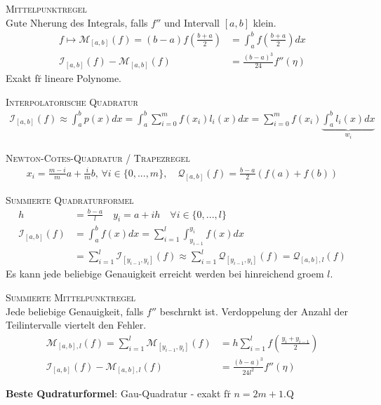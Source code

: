 \textsc{Mittelpunktregel}\\
Gute N\a herung des Integrals, falls $f''$ und Intervall $[a,b]$ klein.
\begin{align*}
f \mapsto \mathcal{M}_{[a,b]}(f) = (b-a)f\left(\frac{b+a}{2}\right) &= \int_a^b f\left(\frac{b+a}{2}\right) dx\\
\mathcal{I}_{[a,b]}(f)-\mathcal{M}_{[a,b]}(f) &= \frac{(b-a)^3}{24}f''(\eta)
\end{align*}
Exakt f\u r lineare Polynome.

\textsc{Interpolatorische Quadratur}\\
\begin{align*}
\mathcal{I}_{[a,b]}(f) \approx \int_a^b p(x) dx = \int_a^b \sum_{i=0}^m f(x_i)l_i(x)dx=\sum_{i=0}^m f(x_i) \underbrace{\int_a^b l_i(x)dx}_{w_i}
\end{align*}\vspace{0.2cm}

\textsc{Newton-Cotes-Quadratur / Trapezregel}\\
\begin{align*}
x_i = \frac{m-i}{m}a + \frac{i}{m}b, \, \forall i\in \{0,...,m\}, \quad \mathcal{Q}_{[a,b]}(f)=\frac{b-a}{2}(f(a)+f(b))
\end{align*}

\textsc{Summierte Quadraturformel}\\
\begin{align*}
h&=\frac{b-a}{l} \quad y_i = a+ih \quad \forall i\in \{0,...,l\}\\
\mathcal{I}_{[a,b]}(f)&=\int_a^b f(x)dx = \sum_{i=1}^l\int_{y_{i-1}}^{y_i} f(x)dx\\ &= \sum_{i=1}^l \mathcal{I}_{[y_{i-1},y_i]}(f) \approx \sum_{i=1}^l \mathcal{Q}_{[y_{i-1},y_i]}(f) = \mathcal{Q}_{[a,b],l}(f)
\end{align*}
Es kann jede beliebige Genauigkeit erreicht werden bei hinreichend gro\s em $l$.

\textsc{Summierte Mittelpunktregel}\\
Jede beliebige Genauigkeit, falls $f''$ beschr\a nkt ist. Verdoppelung der Anzahl der Teilintervalle viertelt den Fehler.
\begin{align*}
\mathcal{M}_{[a,b],l}(f) = \sum_{i=1}^l \mathcal{M}_{[y_{i-1},y_i]}(f) &= h \sum_{i=1}^l f \left(\frac{y_i+y_{i-1}}{2}\right)\\
\mathcal{I}_{[a,b]}(f)-\mathcal{M}_{[a,b],l}(f) &= \frac{(b-a)^3}{24l^2}f''(\eta)
\end{align*}

\textbf{Beste Qudraturformel}: Gau\s -Quadratur - exakt f\u r $n=2m+1$.Q

